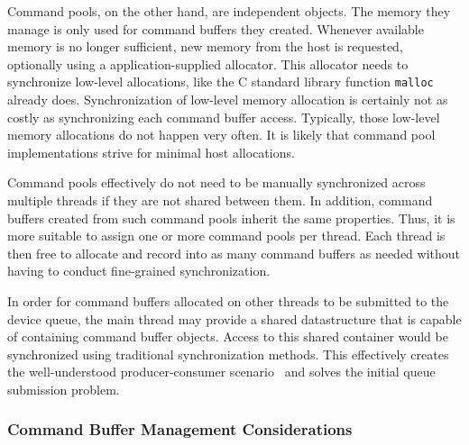      Command pools, on the other hand, are independent objects.
      The memory they manage is only used for command buffers they created.
      Whenever available memory is no longer sufficient, new memory from the host is requested, optionally using a application-supplied allocator.
      This allocator needs to synchronize low-level allocations, like the C standard library function \lstinline{malloc} already does.
      Synchronization of low-level memory allocation is certainly not as costly as synchronizing each command buffer access.
      Typically, those low-level memory allocations do not happen very often.
      It is likely that command pool implementations strive for minimal host allocations.

      Command pools effectively do not need to be manually synchronized across multiple threads if they are not shared between them.
      In addition, command buffers created from such command pools inherit the same properties.
      Thus, it is more suitable to assign one or more command pools per thread.
      Each thread is then free to allocate and record into as many command buffers as needed without having to conduct fine-grained synchronization.

      In order for command buffers allocated on other threads to be submitted to the device queue, the main thread may provide a shared datastructure that is capable of containing command buffer objects.
      Access to this shared container would be synchronized using traditional synchronization methods.
      This effectively creates the well-understood producer-consumer scenario~\cite{EWD:EWD329} and solves the initial queue submission problem.


      \subsubsection{Command Buffer Management Considerations}

